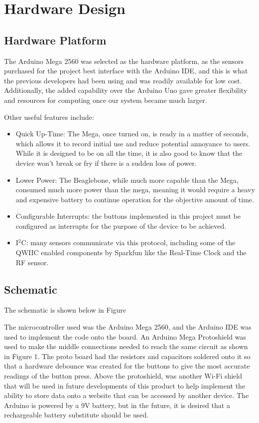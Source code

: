 \documentclass{article}
\begin{document}
\section{Hardware Design}

\subsection{Hardware Platform}
The Arduino Mega 2560 was selected as the hardware platform, as the sensors purchased for the project best interface with the Arduino IDE, and this is what the previous developers had been using and was readily available for low cost. Additionally, the added capability over the Arduino Uno gave greater flexibility and resources for computing once our system became much larger.  

Other useful features include: 
\begin{itemize}
	\item Quick Up-Time: The Mega, once turned on, is ready in a matter of seconds, which allows it to record initial use and reduce potential annoyance to users. While it is designed to be on all the time, it is also good to know that the device won't break or fry if there is a sudden loss of power. 
	\item Lower Power: The Beaglebone, while much more capable than the Mega, consumed much more power than the mega, meaning it would require a heavy and expensive battery to continue operation for the objective amount of time. 
	\item Configurable Interrupts: the buttons implemented in this project must be configured as interrupts for the purpose of the device to be achieved. 
	\item I$^2$C: many sensors communicate via this protocol, including some of the QWIIC enabled components by Sparkfun like the Real-Time Clock and the RF sensor. 
\end{itemize}

\subsection{Schematic}

The schematic is shown below in Figure


The microcontroller used was the Arduino Mega 2560, and the Arduino IDE was used to implement the code onto the board. An Arduino Mega Protoshield was used to make the middle connections needed to reach the same circuit as shown in Figure 1. The proto board had the resistors and capacitors soldered onto it so that a hardware debounce was created for the buttons to give the most accurate readings of the button press. Above the protoshield, was another Wi-Fi shield that will be used in future developments of this product to help implement the ability to store data onto a website that can be accessed by another device. The Arduino is powered by a 9V battery, but in the future, it is desired that a rechargeable battery substitute should be used.
 
\end{document}

